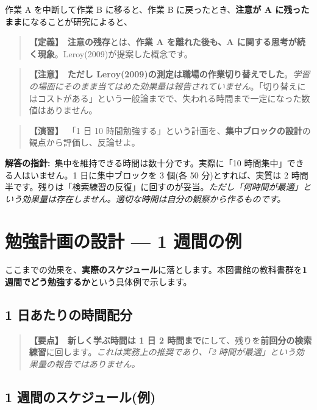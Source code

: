 \documentclass{article}
\begin{document}
作業 A を中断して作業 B に移ると、作業 B に戻ったとき、\textbf{注意が A に残ったまま}になることが研究によると、

\begin{quote}
\textbf{【定義】}\ \textbf{注意の残存}とは、\textbf{作業 A を離れた後も、A に関する思考が続く現象}。Leroy(2009)が提案した概念です。
\end{quote}

\begin{quote}
\textbf{【注意】}\ \textbf{ただし Leroy(2009)の測定は職場の作業切り替えでした}。\emph{学習の場面にそのまま当てはめた効果量は報告されていません}。「切り替えにはコストがある」という一般論までで、失われる時間まで一定になった数値はありません。
\end{quote}

\begin{quote}
\textbf{【演習】}\ 「1 日 10 時間勉強する」という計画を、\textbf{集中ブロックの設計}の観点から評価し、反論せよ。
\end{quote}

\textbf{解答の指針:}\ 集中を維持できる時間は数十分です。実際に「10 時間集中」できる人はいません。1 日に集中ブロックを 3 個(各 50 分)とすれば、実質は 2 時間半です。残りは「検索練習の反復」に回すのが妥当。\emph{ただし「何時間が最適」という効果量は存在しません。適切な時間は自分の観察から作るものです。}

\section{勉強計画の設計 — 1 週間の例}

ここまでの効果を、\textbf{実際のスケジュール}に落とします。本図書館の教科書群を\textbf{1 週間でどう勉強するか}という具体例で示します。

\subsection{1 日あたりの時間配分}

\begin{quote}
\textbf{【要点】}\ \textbf{新しく学ぶ時間は 1 日 2 時間まで}にして、残りを\textbf{前回分の検索練習}に回します。\emph{これは実務上の推奨であり、「2 時間が最適」という効果量の報告ではありません。}
\end{quote}

\subsection{1 週間のスケジュール(例)}
\end{document}
